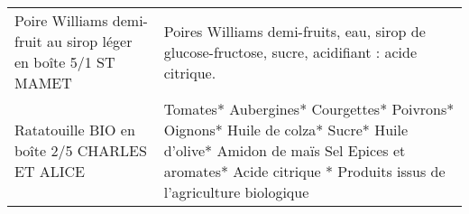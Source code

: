 \begin{longtable}{p{5cm}p{10cm}}
                                           Poire Williams demi-fruit au sirop léger en boîte 5/1 ST MAMET &                                                                                                                                                                                                                                                                                                                                                                                                                                                                                                                                                                                                                                                                                                                                                                                                                                                                                                                                         Poires Williams demi-fruits, eau, sirop de glucose-fructose, sucre, acidifiant : acide citrique. \\
                                                            Ratatouille BIO en boîte 2/5 CHARLES ET ALICE &                                                                                                                                                                                                                                                                                                                                                                                                                                                                                                                                                                                                                                                                                                                                                                                                                                 Tomates*  Aubergines*  Courgettes*  Poivrons*  Oignons*  Huile de colza*  Sucre*  Huile d'olive*  Amidon de maïs  Sel  Epices et aromates*  Acide citrique  * Produits issus de l'agriculture biologique \\

\end{longtable}

